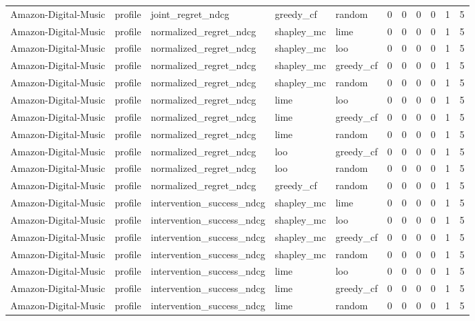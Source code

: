 \begin{table}[t]
{\begin{tabular}{lllllrrrrrr}
Amazon-Digital-Music & profile & joint\_regret\_ndcg & greedy\_cf & random & 0 & 0 & 0 & 0 & 1 & 5 \\
Amazon-Digital-Music & profile & normalized\_regret\_ndcg & shapley\_mc & lime & 0 & 0 & 0 & 0 & 1 & 5 \\
Amazon-Digital-Music & profile & normalized\_regret\_ndcg & shapley\_mc & loo & 0 & 0 & 0 & 0 & 1 & 5 \\
Amazon-Digital-Music & profile & normalized\_regret\_ndcg & shapley\_mc & greedy\_cf & 0 & 0 & 0 & 0 & 1 & 5 \\
Amazon-Digital-Music & profile & normalized\_regret\_ndcg & shapley\_mc & random & 0 & 0 & 0 & 0 & 1 & 5 \\
Amazon-Digital-Music & profile & normalized\_regret\_ndcg & lime & loo & 0 & 0 & 0 & 0 & 1 & 5 \\
Amazon-Digital-Music & profile & normalized\_regret\_ndcg & lime & greedy\_cf & 0 & 0 & 0 & 0 & 1 & 5 \\
Amazon-Digital-Music & profile & normalized\_regret\_ndcg & lime & random & 0 & 0 & 0 & 0 & 1 & 5 \\
Amazon-Digital-Music & profile & normalized\_regret\_ndcg & loo & greedy\_cf & 0 & 0 & 0 & 0 & 1 & 5 \\
Amazon-Digital-Music & profile & normalized\_regret\_ndcg & loo & random & 0 & 0 & 0 & 0 & 1 & 5 \\
Amazon-Digital-Music & profile & normalized\_regret\_ndcg & greedy\_cf & random & 0 & 0 & 0 & 0 & 1 & 5 \\
Amazon-Digital-Music & profile & intervention\_success\_ndcg & shapley\_mc & lime & 0 & 0 & 0 & 0 & 1 & 5 \\
Amazon-Digital-Music & profile & intervention\_success\_ndcg & shapley\_mc & loo & 0 & 0 & 0 & 0 & 1 & 5 \\
Amazon-Digital-Music & profile & intervention\_success\_ndcg & shapley\_mc & greedy\_cf & 0 & 0 & 0 & 0 & 1 & 5 \\
Amazon-Digital-Music & profile & intervention\_success\_ndcg & shapley\_mc & random & 0 & 0 & 0 & 0 & 1 & 5 \\
Amazon-Digital-Music & profile & intervention\_success\_ndcg & lime & loo & 0 & 0 & 0 & 0 & 1 & 5 \\
Amazon-Digital-Music & profile & intervention\_success\_ndcg & lime & greedy\_cf & 0 & 0 & 0 & 0 & 1 & 5 \\
Amazon-Digital-Music & profile & intervention\_success\_ndcg & lime & random & 0 & 0 & 0 & 0 & 1 & 5 \\

\end{tabular}}
\end{table}

